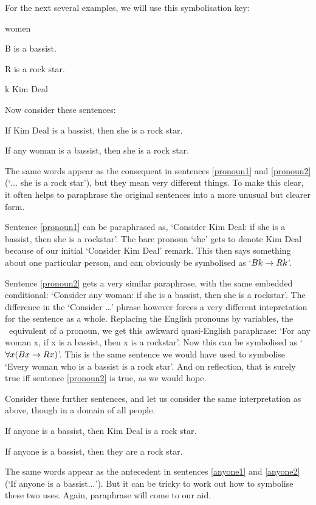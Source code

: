 For the next several examples, we will use this symbolisation key:
	\begin{ekey}
		\item[\text{domain}] women
		\item[B\meta{x}]  is a bassist.
		\item[R\meta{x}]  is a rock star.
		\item[k] Kim Deal
	\end{ekey}
Now consider these sentences:
	\begin{earg}
		\item[\ex{pronoun1}] If Kim Deal is a bassist, then she is a rock star.
		\item[\ex{pronoun2}] If any woman is a bassist, then she is a rock star.
	\end{earg}
The same words appear as the consequent in sentences \ref{pronoun1} and \ref{pronoun2} (`$…$ she is a rock star'), but they mean very different things. To make this clear, it often helps to paraphrase the original sentences into a more unusual but clearer form.

Sentence \ref{pronoun1} can be paraphrased as, `Consider Kim Deal: if she is a bassist, then she is a rockstar'. The bare pronoun `she' gets to denote Kim Deal because of our initial `Consider Kim Deal' remark. This then says something about one particular person, and can obviously be symbolised as `$Bk \rightarrow Rk$'.

Sentence \ref{pronoun2} gets a very similar paraphrase, with the same embedded conditional: `Consider any woman: if she is a bassist, then she is a rockstar'. The difference in the `Consider …' phrase however forces a very different intepretation for the sentence as a whole. Replacing the English pronouns by variables, the \FOL\ equivalent of a pronoun, we get this awkward quasi-English paraphrase: `For any woman x, if x is a bassist, then x is a rockstar'. Now this can be symbolised as `$\forall x (Bx \rightarrow Rx)$'. This is the same sentence we would have used to symbolise `Every woman who is a bassist is a rock star'. And on reflection, that is surely true iff sentence \ref{pronoun2} is true, as we would hope.

Consider these further sentences, and let us consider the same interpretation as above, though in a domain of all people.
	\begin{earg}
		\item[\ex{anyone1}] If anyone is a bassist, then Kim Deal is a rock star.
		\item[\ex{anyone2}] If anyone is a bassist, then they are a rock star.
	\end{earg}
The same words appear as the antecedent in sentences \ref{anyone1} and \ref{anyone2}  (`If anyone is a bassist$…$'). But it can be tricky to work out how to symbolise these two uses. Again, paraphrase will come to our aid. 

